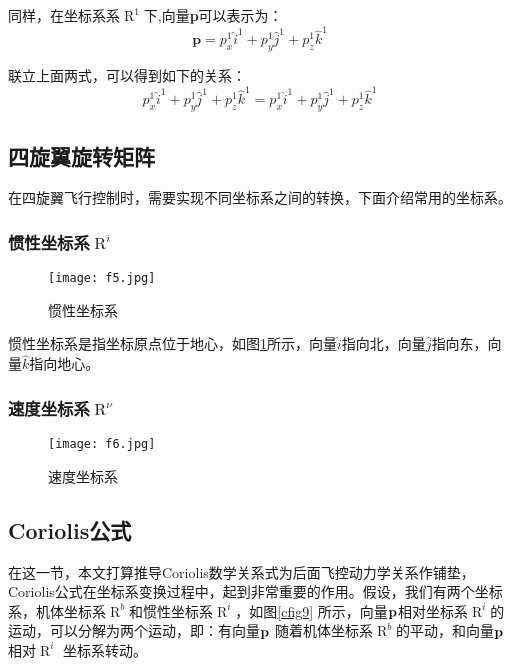 同样，在坐标系系$\mathop R\nolimits^1 $下,向量{\bf{p}}可以表示为：
%
\begin{equation}
\mathbf{p} = p_{x}^{1} \hat{i}^1 + p_{y}^{1} \hat{j}^1 + p_{z}^{1} \hat{k}^1
\end{equation}

联立上面两式，可以得到如下的关系：
%
\begin{equation}
p_{x}^{1} \hat{i}^1 + p_{y}^{1} \hat{j}^1 + p_{z}^{1} \hat{k}^1 = p_{x}^{1} \hat{i}^1 + p_{y}^{1} \hat{j}^1 + p_{z}^{1} \hat{k}^1
\end{equation}



\subsection{四旋翼旋转矩阵} \label{2.1.2}

在四旋翼飞行控制时，需要实现不同坐标系之间的转换，下面介绍常用的坐标系。

\subsubsection{惯性坐标系$\mathop R\nolimits^i $}

\begin{figure}[!ht]
\centering
\texttt{[image: f5.jpg]}
\caption{惯性坐标系}
\label{fig4}
\end{figure}

惯性坐标系是指坐标原点位于地心，如图\ref{fig4}所示，向量$\hat i$指向北，向量$\hat j$指向东，向量$\hat k$指向地心。

\subsubsection{速度坐标系$\mathop R\nolimits^\nu$}

\begin{figure}[!ht]
\centering
\texttt{[image: f6.jpg]}
\caption{速度坐标系}
\label{fig5}
\end{figure}


\subsection{Coriolis公式}\label{2.1.3}
在这一节，本文打算推导Coriolis数学关系式为后面飞控动力学关系作铺垫，Coriolis公式在坐标系变换过程中，起到非常重要的作用。假设，我们有两个坐标系，机体坐标系$\mathop R\nolimits^b $和惯性坐标系$\mathop R\nolimits^i $，如图\ref{cfig9} 所示，向量${\bf{p}}$相对坐标系$\mathop R\nolimits^i $的运动，可以分解为两个运动，即：有向量${\bf{p}}$ 随着机体坐标系$\mathop R\nolimits^b $的平动，和向量${\bf{p}}$相对$\mathop R\nolimits^i $ 坐标系转动。

